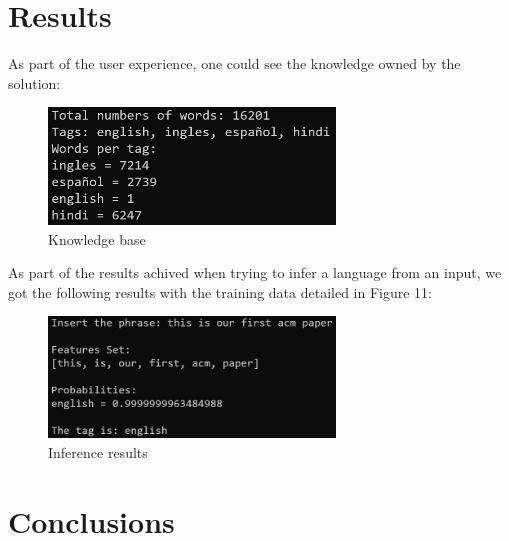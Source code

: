 \documentclass[sigconf,12pt,review=false,natbib=false]{acmart}
\begin{document}
\section{Results}

As part of the user experience, one could see the knowledge owned by the solution: \\

\begin{figure}[h!]
    \centering
    \includegraphics[width=3in]{knowledge}
    \caption{Knowledge base}
    \label{fig:knowledge}
\end{figure}

As part of the results achived when trying to infer a language from an input, we got the following results with the
training data detailed in Figure 11: \\

\begin{figure}[h!]
    \centering
    \includegraphics[width=3in]{inference}
    \caption{Inference results}
    \label{fig:inference}
\end{figure}

\section{Conclusions}
\end{document}

